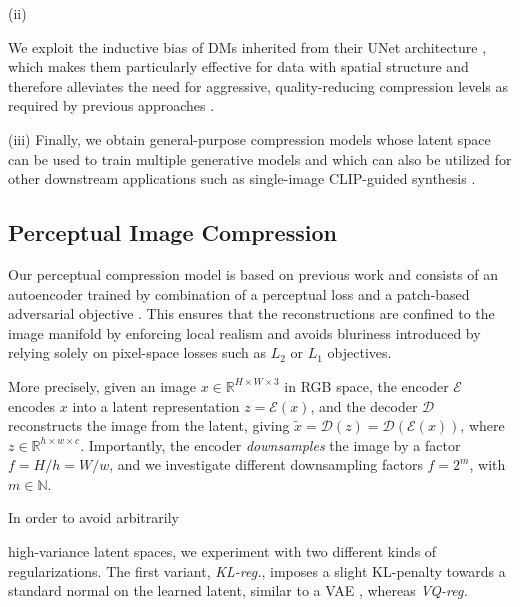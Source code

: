 (ii)

We exploit the inductive bias of DMs inherited from their UNet architecture \cite{DBLP:conf/miccai/RonnebergerFB15}, which makes them particularly effective for data with spatial structure and therefore alleviates the need for aggressive, quality-reducing compression levels as required by previous approaches \cite{DBLP:journals/corr/abs-2012-09841,
DBLP:journals/corr/abs-2102-12092}.

(iii) Finally, we obtain general-purpose compression models whose latent space can be used to train multiple generative models and which can also be utilized for other downstream applications such as single-image CLIP-guided synthesis \cite{Frans2021CLIPDrawET}.

\subsection{Perceptual Image Compression}

\label{subsec:stageone}

Our perceptual compression model is based on previous work \cite{DBLP:journals/corr/abs-2012-09841} and consists of an autoencoder trained by combination of a perceptual loss \cite{lpips} and a patch-based \cite{DBLP:conf/cvpr/IsolaZZE17} adversarial objective \cite{dosovitskiy201perceptual, DBLP:journals/corr/abs-2012-09841, yu2021vectorquantized}. This ensures that the reconstructions are confined to the image manifold by enforcing local realism and avoids bluriness introduced by relying solely on pixel-space losses such as $L_2$ or $L_1$ objectives.

More precisely, given an image $x \in \mathbb{R}^{H \times W \times 3}$ in RGB space, the encoder $\mathcal{E}$ encodes $x$ into a latent representation $z=\mathcal{E}(x)$, and the decoder $\mathcal{D}$
reconstructs the image from the latent, giving $\tilde{x} = \mathcal{D}(z) = \mathcal{D}(\mathcal{E}(x))$, where $z \in \mathbb{R}^{h \times w \times c}$. Importantly, the encoder \emph{downsamples} the image by a factor $f = H/h = W/w$, and we investigate different downsampling factors $f = 2^m$, with $m \in \mathbb{N}$. 

In order to avoid arbitrarily 

high-variance latent spaces, we experiment with two different kinds of regularizations. The first variant, \emph{KL-reg.}, imposes a slight KL-penalty towards a standard normal on the learned latent, similar to a VAE \cite{VAE,VAE2}, whereas \emph{VQ-reg.}

